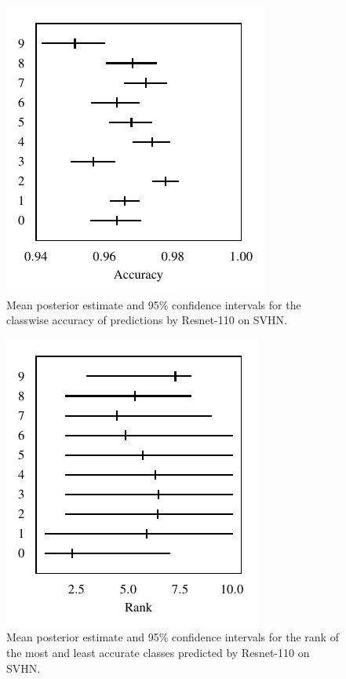 \documentclass{article}
\begin{document}
\begin{figure}[t]
    \centering
    \includegraphics{figures/svhn_accuracy.pdf}  
    \caption{
        Mean posterior estimate and 95\% confidence intervals for the classwise accuracy of predictions by Resnet-110 on SVHN.
    }
    \label{fig:svhn_acc}
\end{figure}

\begin{figure}[t]
    \centering
    \includegraphics{figures/svhn_rank.pdf}  
    \caption{
        Mean posterior estimate and 95\% confidence intervals for the rank of the most and least accurate classes predicted by Resnet-110 on SVHN.
    }
    \label{fig:svhn_rank}
\end{figure}
\end{document}
